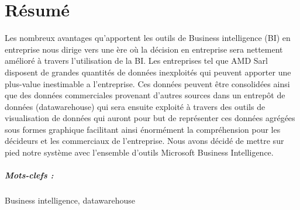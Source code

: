 \chapter*{Résumé}%
%
Les nombreux avantages qu’apportent les outils de Business intelligence (BI) en entreprise nous dirige vers une ère où la décision en entreprise sera nettement amélioré à travers l’utilisation de la BI. Les entreprises tel que AMD Sarl disposent de grandes quantités de données inexploités qui peuvent apporter une plus-value inestimable a l’entreprise. Ces données peuvent être consolidées ainsi que des données commerciales provenant d’autres sources dans un entrepôt de données (datawarehouse) qui sera ensuite exploité à travers des outils de visualisation de données qui auront pour but de représenter ces données agrégées sous formes graphique facilitant ainsi énormément la compréhension pour les décideurs et les commerciaux de l’entreprise. Nous avons décidé de mettre sur pied notre système avec l’ensemble d’outils Microsoft Business Intelligence.

\paragraph{Mots-clefs :}Business intelligence, datawarehouse